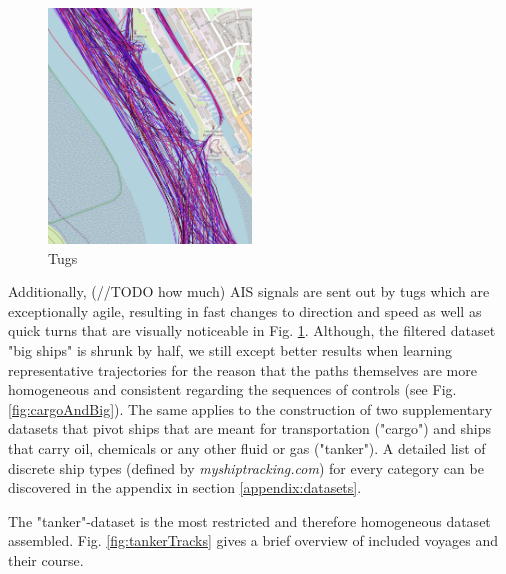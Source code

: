 \begin{figure}
    \includegraphics[width=0.48\textwidth]{images/ais/tracks/Tugs.png}
    \caption{Tugs}
    \label{fig:tugs}
\end{figure}
Additionally, (//TODO how much) AIS signals are sent out by tugs which are exceptionally agile, resulting in fast changes to direction and speed as well as quick turns that are visually noticeable in Fig. \ref{fig:tugs}. Although, the filtered dataset "big ships" is shrunk by half, we still except better results when learning representative trajectories for the reason that the paths themselves are more homogeneous and consistent regarding the sequences of controls (see Fig. \ref{fig:cargoAndBig}). The same applies to the construction of two supplementary datasets that pivot ships that are meant for transportation ("cargo") and ships that carry oil, chemicals or any other fluid or gas ("tanker"). A detailed list of discrete ship types (defined by \textit{myshiptracking.com}) for every category can be discovered in the appendix in section \ref{appendix:datasets}.
\par
The "tanker"-dataset is the most restricted and therefore homogeneous dataset assembled. Fig. \ref{fig:tankerTracks} gives a brief overview of included voyages and their course.
